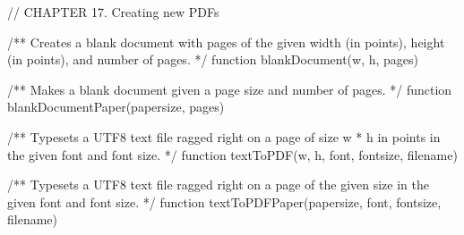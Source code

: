 // CHAPTER 17. Creating new PDFs

/** Creates a blank document with pages of the given width (in points), height
(in points), and number of pages. */
function blankDocument(w, h, pages)

/** Makes a blank document given a page size and number of pages. */
function blankDocumentPaper(papersize, pages)

/** Typesets a UTF8 text file ragged right on a page of size w * h in points
in the given font and font size. */
function textToPDF(w, h, font, fontsize, filename)

/** Typesets a UTF8 text file ragged right on a page of the given size in the
given font and font size. */
function textToPDFPaper(papersize, font, fontsize, filename)
